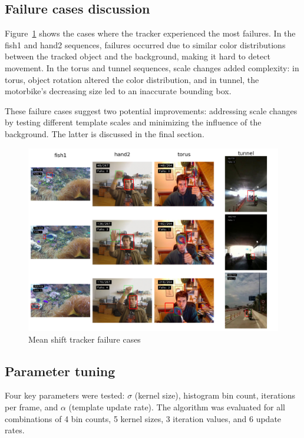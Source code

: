 \documentclass[9pt]{IEEEtran}
\begin{document}
  
  \subsection{Failure cases discussion}
  Figure~\ref{fig:failures} shows the cases where the tracker experienced the most failures.
   In the fish1 and hand2 sequences, failures occurred due to similar color distributions 
   between the tracked object and the background, making it hard to detect movement.
    In the torus and tunnel sequences, scale changes added complexity: in torus, object 
    rotation altered the color distribution, and in tunnel, the motorbike’s decreasing size 
    led to an inaccurate bounding box.

  These failure cases suggest two potential improvements: addressing scale changes by testing
   different template scales and minimizing the influence of the background. The latter is 
   discussed in the final section.

  \begin{figure}[h]
    \centering
    \includegraphics[width=0.99\columnwidth]{figures/failures.png}
    \caption{Mean shift tracker failure cases}
    \label{fig:failures}
  \end{figure}

\subsection{Parameter tuning}
Four key parameters were tested: $\sigma$ (kernel size), histogram bin count, 
iterations per frame, and $\alpha$ (template update rate). The algorithm was 
evaluated for all combinations of 4 bin counts, 5 kernel sizes, 3 iteration values,
 and 6 update rates.
\end{document}
